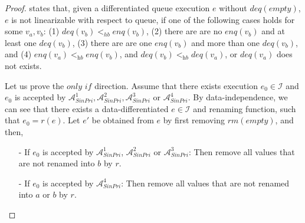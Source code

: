 %


\begin {proof}

\cite{DBLP:conf/icalp/BouajjaniEEH15} states that, given a differentiated queue execution $e$ without $\textit{deq}(\textit{empty})$, $e$ is not linearizable with respect to queue, if one of the following cases holds for some $v_a,v_b$: (1) $\textit{deq}(v_b) <_{hb} \textit{enq}(v_b)$, (2) there are are no $\textit{enq}(v_b)$ and at least one $\textit{deq}(v_b)$, (3) there are are one $\textit{enq}(v_b)$ and more than one $\textit{deq}(v_b)$, and (4) $\textit{enq}(v_a) <_{\textit{hb}} \textit{enq}(v_b)$, and $\textit{deq}(v_b) <_{\textit{hb}} \textit{deq}(v_a)$, or $\textit{deq}(v_a)$ does not exists.

Let us prove the $\textit{only if}$ direction. Assume that there exists execution $e_0 \in \mathcal{I}$ and $e_0$ is accepted by $\mathcal{A}_{\textit{SinPri}}^1, \mathcal{A}_{\textit{SinPri}}^2, \mathcal{A}_{\textit{SinPri}}^3$ or $\mathcal{A}_{\textit{SinPri}}^4$. By data-independence, we can see that there exists a data-differentiated $e \in \mathcal{I}$ and renaming function, such that $e_0=r(e)$. Let $e'$ be obtained from $e$ by first removing $\textit{rm}(\textit{empty})$, and then,

\begin{itemize}
\setlength{\itemsep}{0.5pt}
\item[-] If $e_0$ is accepted by $\mathcal{A}_{\textit{SinPri}}^1$, $\mathcal{A}_{\textit{SinPri}}^2$ or $\mathcal{A}_{\textit{SinPri}}^3$: Then remove all values that are not renamed into $b$ by $r$.

\item[-] If $e_0$ is accepted by $\mathcal{A}_{\textit{SinPri}}^4$: Then remove all values that are not renamed into $a$ or $b$ by $r$.
\end{itemize}


\end{proof}

